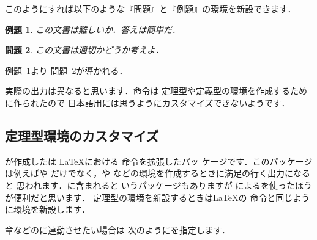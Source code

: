 {{\begin{intext}
\newtheorem{Prob}{問題}[chapter]
\newtheorem{Exe}[Prob]{例題} 
\end{intext}

このようにすれば以下のような『問題』と『例題』の環境を新設できます．

\begin{inout}
\begin{Exe}\label{Hoge:ware}
この文書は難しいか．答えは簡単だ．
\end{Exe}
\begin{Prob}\label{Geho:yueni}
この文書は適切かどうか考えよ．
\end{Prob}
例題~\ref{Hoge:ware}より
問題~\ref{Geho:yueni}が導かれる． 
\end{inout}

実際の出力は異なると思います．命令は
定理型や定義型の環境を作成するために作られたので
日本語用には思うようにカスタマイズできないようです．

\subsection{定理型環境のカスタマイズ}
%
%
%
が作成したは
{\LaTeX}における 命令を拡張したパッ
ケージです．このパッケージは例えばや
だけでなく，や
などの環境を作成するときに満足の行く出力になると
思われます．{\AmSLaTeX}に含まれると
いうパッケージもありますが
によるを使ったほうが便利だと思います．
定理型の環境を新設するときは{\LaTeX}の 
命令と同じように環境を新設します．


%
章などのに連動させたい場合は
次のようにを指定します．

% 

}}
